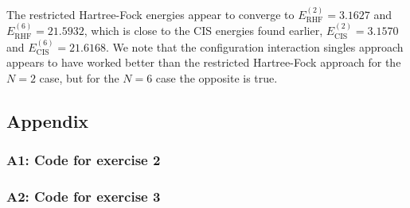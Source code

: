 \documentclass[a4paper]{article}
\begin{document}
The restricted Hartree-Fock energies appear to converge to $E_\text{RHF}^{(2)}=3.1627$ and $E_\text{RHF}^{(6)}=21.5932$, which is close to the CIS energies found earlier, $E_\text{CIS}^{(2)}=3.1570$ and $E_\text{CIS}^{(6)}=21.6168$. We note that the configuration interaction singles approach appears to have worked better than the restricted Hartree-Fock approach for the $N=2$ case, but for the $N=6$ case the opposite is true.

\newpage
\subsection*{Appendix}
\subsubsection*{A1: Code for exercise 2}


\newpage
\subsubsection*{A2: Code for exercise 3}

\end{document}

